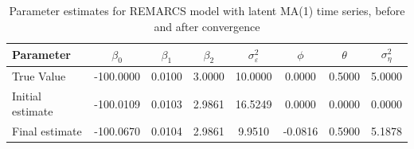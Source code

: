 \begin{table}[H]
\centering\begin{tabular}{lccccccc}
\toprule
Parameter & $\beta_0$ & $\beta_1$ & $\beta_2$ & $\sigma_\varepsilon^2$ & $\phi$ & $\theta$ & $\sigma_\eta^2$ \\
\midrule
True Value & -100.0000 & 0.0100 & 3.0000 & 10.0000 & 0.0000 & 0.5000 & 5.0000 \\
\midrule
Initial estimate & -100.0109 & 0.0103 & 2.9861 & 16.5249 & 0.0000 & 0.0000 & 0.0000 \\
Final estimate & -100.0670 & 0.0104 & 2.9861 & 9.9510 & -0.0816 & 0.5900 & 5.1878 \\
\hline
\end{tabular}
\caption{Parameter estimates for REMARCS model with latent MA(1) time series, before and after convergence}
\label{tab:param_estimates_ar}
\end{table}

